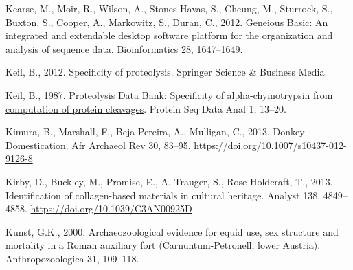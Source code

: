 \documentclass[preprint, 3p, authoryear]{elsarticle} %
\newlength{\cslhangindent}
\newlength{\cslentryspacingunit} %
\newenvironment{CSLReferences}[2] %
 {%
  \setlength{\parindent}{0pt}
  \ifodd #1
  \let\oldpar\par
  \def\par{\hangindent=\cslhangindent\oldpar}
  \fi
  \setlength{\parskip}{#2\cslentryspacingunit}
 }%
 {}
\begin{document}
\begin{CSLReferences}{1}{0}
\leavevmode{}%
Kearse, M., Moir, R., Wilson, A., Stones-Havas, S., Cheung, M., Sturrock, S., Buxton, S., Cooper, A., Markowitz, S., Duran, C., 2012. Geneious {Basic}: An integrated and extendable desktop software platform for the organization and analysis of sequence data. Bioinformatics 28, 1647--1649.

\leavevmode{}%
Keil, B., 2012. Specificity of proteolysis. {Springer Science \& Business Media}.

\leavevmode{}%
Keil, B., 1987. \href{https://www.ncbi.nlm.nih.gov/pubmed/3447153}{Proteolysis {Data Bank}: Specificity of alpha-chymotrypsin from computation of protein cleavages}. Protein Seq Data Anal 1, 13--20.

\leavevmode{}%
Kimura, B., Marshall, F., Beja-Pereira, A., Mulligan, C., 2013. Donkey {Domestication}. Afr Archaeol Rev 30, 83--95. \url{https://doi.org/10.1007/s10437-012-9126-8}

\leavevmode{}%
Kirby, D., Buckley, M., Promise, E., A. Trauger, S., Rose Holdcraft, T., 2013. Identification of collagen-based materials in cultural heritage. Analyst 138, 4849--4858. \url{https://doi.org/10.1039/C3AN00925D}

\leavevmode{}%
Kunst, G.K., 2000. Archaeozoological evidence for equid use, sex structure and mortality in a {Roman} auxiliary fort ({Carnuntum-Petronell}, lower {Austria}). Anthropozoologica 31, 109--118.


\end{CSLReferences}
\end{document}

